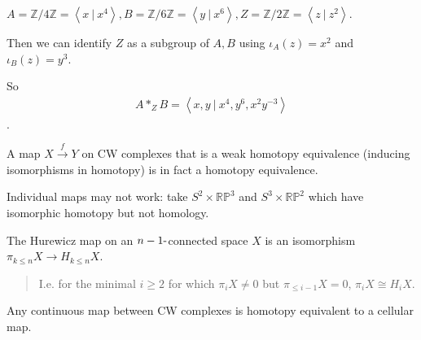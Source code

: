 \begin{description}
\tightlist
\item[Example (of pushing out with Van Kampen)]
\(A = {\mathbb{Z}}/4{\mathbb{Z}}= \left\langle{x {~\mathrel{\Big|}~}x^4}\right\rangle, B = {\mathbb{Z}}/6{\mathbb{Z}}= \left\langle{y {~\mathrel{\Big|}~}x^6}\right\rangle, Z = {\mathbb{Z}}/2{\mathbb{Z}}= \left\langle{z {~\mathrel{\Big|}~}z^2}\right\rangle\).
\end{description}

Then we can identify \(Z\) as a subgroup of \(A, B\) using
\(\iota_A(z) = x^2\) and \(\iota_B(z) = y^3\).

So
\begin{align*}A\ast_Z B = \left\langle{x, y {~\mathrel{\Big|}~}x^4, y^6, x^2y^{-3}}\right\rangle\end{align*}
.

\begin{theorem}

A map \(X \xrightarrow{f} Y\) on CW complexes that is a weak homotopy
equivalence (inducing isomorphisms in homotopy) is in fact a homotopy
equivalence.

\end{theorem}

\begin{warnings}

Individual maps may not work: take \(S^2 \times{\mathbb{RP}}^3\) and
\(S^3 \times{\mathbb{RP}}^2\) which have isomorphic homotopy but not
homology.

\end{warnings}

\begin{theorem}[Hurewicz]

The Hurewicz map on an \(n-1{\hbox{-}}\)connected space \(X\) is an
isomorphism \(\pi_{k\leq n}X \to H_{k\leq n} X\).

\begin{quote}
I.e. for the minimal \(i\geq 2\) for which \(\pi_iX \neq 0\) but
\(\pi_{\leq i-1}X = 0\), \(\pi_iX \cong H_iX\).
\end{quote}

\end{theorem}

\begin{theorem}

Any continuous map between CW complexes is homotopy equivalent to a
cellular map.

\end{theorem}

